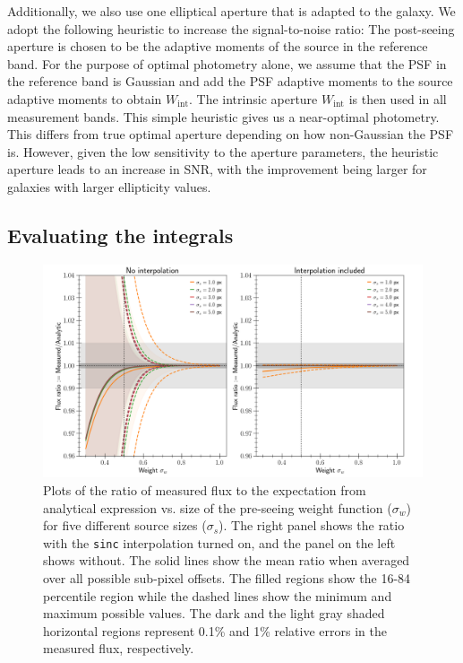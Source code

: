 \documentclass[DM,lsstdraft, authoryear,toc]{lsstdoc}
\begin{document}
Additionally, we also use one elliptical aperture that is adapted to the galaxy.
We adopt the following heuristic to increase the signal-to-noise ratio:
The post-seeing aperture is chosen to be the adaptive moments of the source in the reference band.
For the purpose of optimal photometry alone, we assume that the PSF in the reference band is Gaussian and add the PSF adaptive moments to the source adaptive moments to obtain $W_\text{int}$.
The intrinsic aperture $W_\text{int}$ is then used in all measurement bands.
This simple heuristic gives us a near-optimal photometry.
This differs from true optimal aperture depending on how non-Gaussian the PSF is.
However, given the low sensitivity to the aperture parameters, the heuristic aperture leads to an increase in SNR,
with the improvement being larger for galaxies with larger ellipticity values.

\subsection{Evaluating the integrals}
\begin{figure}
    \includegraphics[scale=0.2]{figures/interpolation.png}
    \caption{Plots of the ratio of measured flux to the expectation from analytical expression vs. size of the pre-seeing weight function ($\sigma_w$) for five different source sizes ($\sigma_s$).
    The right panel shows the ratio with the \texttt{sinc} interpolation turned on, and the panel on the left shows without.
    The solid lines show the mean ratio when averaged over all possible sub-pixel offsets.
    The filled regions show the 16-84 percentile region while the dashed lines show the minimum and maximum possible values.
    The dark and the light gray shaded horizontal regions represent 0.1\% and 1\% relative errors in the measured flux, respectively.}
    \label{fig:interpolation}
\end{figure}
\end{document}
